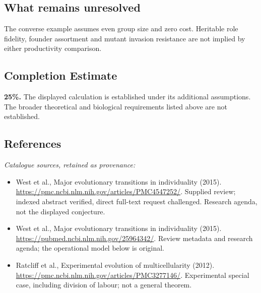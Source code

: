 \documentclass[11pt]{article}
\begin{document}
\subsection{What remains unresolved}
The converse example assumes even group size and zero cost. Heritable role fidelity, founder assortment and mutant invasion resistance are not implied by either productivity comparison.
\subsection{Completion Estimate}
\textbf{25\%.} The displayed calculation is established under its additional assumptions. The broader theoretical and biological requirements listed above are not established.
\subsection{References}
\noindent\emph{Catalogue sources, retained as provenance:}
\begin{itemize}
\item West et al., Major evolutionary transitions in individuality (2015). \url{https://pmc.ncbi.nlm.nih.gov/articles/PMC4547252/}. Supplied review; indexed abstract verified, direct full-text request challenged. Research agenda, not the displayed conjecture.
\item West et al., Major evolutionary transitions in individuality (2015). \url{https://pubmed.ncbi.nlm.nih.gov/25964342/}. Review metadata and research agenda; the operational model below is original.
\item Ratcliff et al., Experimental evolution of multicellularity (2012). \url{https://pmc.ncbi.nlm.nih.gov/articles/PMC3277146/}. Experimental special case, including division of labour; not a general theorem.
\end{itemize}
\end{document}
